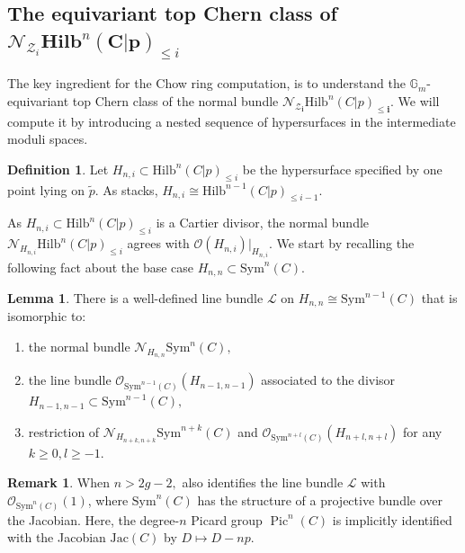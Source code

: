 \documentclass[10.5pt]{amsart}
\theoremstyle{definition}
\theoremstyle{definition}
\theoremstyle{definition}
\theoremstyle{definition}
\newtheorem{lemma}[theorem]{Lemma}
\newtheorem{remark}[theorem]{Remark}
\newtheorem{definition}[theorem]{Definition}
\DeclareMathOperator{\Pic}{Pic}
\newcommand{\Hilb}{\mathrm{Hilb}}
\newcommand{\Sym}{\mathrm{Sym}}
\newcommand{\cZ}{\mathcal{Z}}
\newcommand{\cO}{\mathcal{O}}
\newcommand{\cN}{\mathcal{N}}
\newcommand{\cL}{\mathcal{L}}
\newcommand{\bi}{\boldsymbol{i}}
\begin{document}
\subsection{The equivariant top Chern class of $\boldsymbol{\cN}_{\boldsymbol{\cZ}_i}\textbf{Hilb}^n\boldsymbol{(C|p)}_{\le i}$} \label{subsec: topChernClass}


The key ingredient for the Chow ring computation, is to understand the $\mathbb{G}_m$-equivariant top Chern class of the normal bundle $\mathcal{N}_{\cZ_{\bi}}\Hilb^n(C|p)_{\leq \bi}$. We will compute it by introducing a nested sequence of hypersurfaces in the intermediate moduli spaces.

\begin{definition}
Let $H_{n,i}\subset \Hilb^n(C|p)_{\leq i}$ be the hypersurface specified by one point lying on $\tilde{p}.$ As stacks, $H_{n,i}\cong \Hilb^{n-1}(C|p)_{\leq i-1}.$
\end{definition}
As $H_{n,i}\subset\Hilb^n(C|p)_{\leq i}$ is a Cartier divisor, the normal bundle $\mathcal{N}_{H_{n,i}}\Hilb^n(C|p)_{\leq i} $ agrees with $\mathcal{O}(H_{n,i})|_{H_{n,i}}.$ We start by recalling the following fact about the base case $H_{n,n}\subset \Sym^{n}(C).$

\begin{lemma}\cite[Remark 1.2]{Moonen_Polishchuk} \label{lem:LonHnn}
  There is a well-defined line bundle $\mathcal{L}$ on $H_{n,n}\cong \Sym^{n-1}(C)$ that is isomorphic to:\begin{enumerate}
    \item the normal bundle $\mathcal{N}_{H_{n,n}}\Sym^n(C),$
    \item the line bundle $\mathcal{O}_{\Sym^{n-1}(C)}(H_{n-1,n-1})$ associated to the divisor $H_{n-1,n-1}\subset \Sym^{n-1}(C),$
    \item restriction of $\mathcal{N}_{H_{n+k,n+k}}\Sym^{n+k}(C)$ and $\mathcal{O}_{\Sym^{n+l}(C)}(H_{n+l,n+l})$ for any $k\geq 0, l\geq -1.$
  \end{enumerate}
\end{lemma}

\begin{remark}
    When $n>2g-2,$ \cite[§1]{Moonen_Polishchuk} also identifies the line bundle $\cL$ with $\cO_{\Sym^n(C)}(1)$, where $\Sym^n(C)$ has the structure of a projective bundle over the Jacobian. Here, the degree-$n$ Picard group $\Pic^n(C)$ is implicitly identified with the Jacobian $\mathrm{Jac}(C)$ by $D\mapsto D-np$.
\end{remark}
\end{document}
